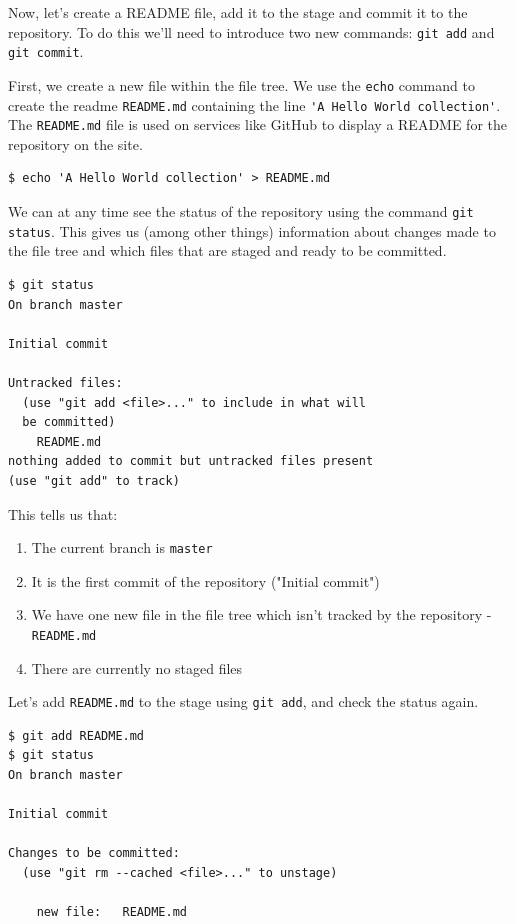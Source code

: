 \documentclass[../main/git_course_main.tex]{subfiles}
\begin{document}
Now, let's create a README file, add it to the stage and commit it to the repository. To do this we'll need to introduce two new commands:
\verb$git add$ and \verb$git commit$.

First, we create a new file within the file tree. We use the \verb$echo$ command to create the readme \verb$README.md$ containing the line \verb$'A Hello World collection'$. The \verb$README.md$ file is used on services like GitHub to display a README for the repository on the site.

\begin{codebox}
\begin{lstlisting}
$ echo 'A Hello World collection' > README.md
\end{lstlisting}
\end{codebox}

We can at any time see the status of the repository using the command \verb$git status$.
This gives us (among other things) information about changes made to the file tree and which files that are staged and ready to be committed.

\begin{codebox}
\begin{lstlisting}
$ git status
On branch master

Initial commit

Untracked files:
  (use "git add <file>..." to include in what will 
  be committed)
	README.md
nothing added to commit but untracked files present 
(use "git add" to track)
\end{lstlisting}
\end{codebox}

This tells us that:

\begin{enumerate}
\item The current branch is \verb$master$
\item It is the first commit of the repository ("Initial commit")
\item We have one new file in the file tree which isn't tracked by the repository - \verb$README.md$
\item There are currently no staged files
\end{enumerate}

Let's add \verb$README.md$ to the stage using \verb$git add$, and check the status again.

\begin{codebox}
\begin{lstlisting}
$ git add README.md
$ git status
On branch master

Initial commit

Changes to be committed:
  (use "git rm --cached <file>..." to unstage)

	new file:   README.md
\end{lstlisting}
\end{codebox}
\end{document}
